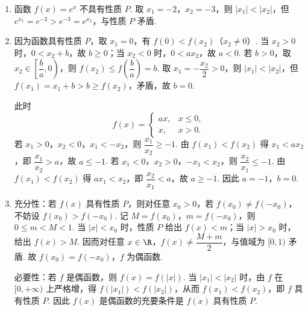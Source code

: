 \begin{solution}
\begin{enumerate}
\item 函数 \(f(x)=e^x\) 不具有性质 \(P\). 取 \(x_1=-2\)，\(x_2=-3\)，则 \(|x_1|<|x_2|\)，但 \(e^{x_1}=e^{-2}>e^{-3}=e^{x_2}\)，与性质 \(P\) 矛盾.

\item 因为函数具有性质 \(P\)，取 \(x_1=0\)，有 \(f(0)<f(x_2)\)（\(x_2\ne0\)）. 当 \(x_2>0\) 时，\(0<x_2+b\)，故 \(b\ge0\)；当 \(x_2<0\) 时，\(0<ax_2\)，故 \(a<0\). 若 \(b>0\)，取 \(x_2\in\left[\dfrac{b}{a},0\right)\)，则 \(f(x_2)\le f\left(\dfrac{b}{a}\right)=b\). 取 \(x_1=-\dfrac{x_2}{2}>0\)，则 \(|x_1|<|x_2|\)，但 \(f(x_1)=x_1+b>b\ge f(x_2)\)，矛盾，故 \(b=0\).

此时
\[
f(x)=
\begin{cases}
ax,&x\le0,\\
x,&x>0.
\end{cases}
\]
若 \(x_1>0\)，\(x_2<0\)，\(x_1<-x_2\)，则 \(\dfrac{x_1}{x_2}\ge-1\). 由 \(f(x_1)<f(x_2)\) 得 \(x_1<ax_2\)，即 \(\dfrac{x_1}{x_2}>a\)，故 \(a\le-1\). 若 \(x_1<0\)，\(x_2>0\)，\(-x_1<x_2\)，则 \(\dfrac{x_2}{x_1}\le-1\). 由 \(f(x_1)<f(x_2)\) 得 \(ax_1<x_2\)，即 \(\dfrac{x_2}{x_1}<a\)，故 \(a\ge-1\). 因此 \(a=-1\)，\(b=0\).

\item 充分性：若 \(f(x)\) 具有性质 \(P\)，则对任意 \(x_0>0\)，若 \(f(x_0)\ne f(-x_0)\)，不妨设 \(f(x_0)>f(-x_0)\). 记 \(M=f(x_0)\)，\(m=f(-x_0)\)，则 \(0\le m<M<1\). 当 \(|x|<x_0\) 时，性质 \(P\) 给出 \(f(x)<m\)；当 \(|x|>x_0\) 时，给出 \(f(x)>M\). 因而对任意 \(x\in\R\)，\(f(x)\ne\dfrac{M+m}{2}\)，与值域为 \([0,1)\) 矛盾. 故 \(f(x_0)=f(-x_0)\)，\(f\) 为偶函数.

必要性：若 \(f\) 是偶函数，则 \(f(x)=f(|x|)\). 当 \(|x_1|<|x_2|\) 时，由 \(f\) 在 \([0,+\infty)\) 上严格增，得 \(f(|x_1|)<f(|x_2|)\)，从而 \(f(x_1)<f(x_2)\)，即 \(f\) 具有性质 \(P\). 因此 \(f(x)\) 是偶函数的充要条件是 \(f(x)\) 具有性质 \(P\).
\end{enumerate}
\end{solution}
